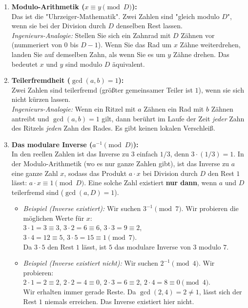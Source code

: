 \documentclass[11pt]{article}
\begin{document}
\begin{enumerate}
    \item \textbf{Modulo-Arithmetik ($x \equiv y \pmod D$):}\\
    Das ist die "Uhrzeiger-Mathematik". Zwei Zahlen sind "gleich modulo $D$", wenn sie bei der Division durch $D$ denselben Rest lassen. \\
    \textit{Ingenieurs-Analogie:} Stellen Sie sich ein Zahnrad mit $D$ Zähnen vor (nummeriert von $0$ bis $D-1$). Wenn Sie das Rad um $x$ Zähne weiterdrehen, landen Sie auf demselben Zahn, als wenn Sie es um $y$ Zähne drehen. Das bedeutet $x$ und $y$ sind modulo $D$ äquivalent.
    
    \item \textbf{Teilerfremdheit ($\gcd(a, b) = 1$):}\\
    Zwei Zahlen sind teilerfremd (größter gemeinsamer Teiler ist $1$), wenn sie sich nicht kürzen lassen. \\
    \textit{Ingenieurs-Analogie:} Wenn ein Ritzel mit $a$ Zähnen ein Rad mit $b$ Zähnen antreibt und $\gcd(a,b)=1$ gilt, dann berührt im Laufe der Zeit \textit{jeder} Zahn des Ritzels \textit{jeden} Zahn des Rades. Es gibt keinen lokalen Verschleiß.
    
    \item \textbf{Das modulare Inverse ($a^{-1} \pmod D$):}\\
    In den reellen Zahlen ist das Inverse zu $3$ einfach $1/3$, denn $3 \cdot (1/3) = 1$. In der Modulo-Arithmetik (wo es nur ganze Zahlen gibt), ist das Inverse zu $a$ eine ganze Zahl $x$, sodass das Produkt $a \cdot x$ bei Division durch $D$ den Rest $1$ lässt: $a \cdot x \equiv 1 \pmod D$. Eine solche Zahl existiert \textbf{nur dann}, wenn $a$ und $D$ teilerfremd sind ($\gcd(a, D) = 1$).
    
    \begin{itemize}
        \item \textit{Beispiel (Inverse existiert):} Wir suchen $3^{-1} \pmod 7$. Wir probieren die möglichen Werte für $x$: \\
        $3 \cdot 1 = 3 \equiv 3$, \quad $3 \cdot 2 = 6 \equiv 6$, \quad $3 \cdot 3 = 9 \equiv 2$, \\
        $3 \cdot 4 = 12 \equiv 5$, \quad \textbf{$3 \cdot 5 = 15 \equiv 1 \pmod 7$}. \\
        Da $3 \cdot 5$ den Rest $1$ lässt, ist $5$ das modulare Inverse von $3$ modulo $7$.
        
        \item \textit{Beispiel (Inverse existiert nicht):} Wir suchen $2^{-1} \pmod 4$. Wir probieren: \\
        $2 \cdot 1 = 2 \equiv 2$, \quad $2 \cdot 2 = 4 \equiv 0$, \quad $2 \cdot 3 = 6 \equiv 2$, \quad $2 \cdot 4 = 8 \equiv 0 \pmod 4$. \\
        Wir erhalten immer gerade Reste. Da $\gcd(2, 4) = 2 \neq 1$, lässt sich der Rest $1$ niemals erreichen. Das Inverse existiert hier nicht.


\end{itemize}
\end{enumerate}
\end{document}
